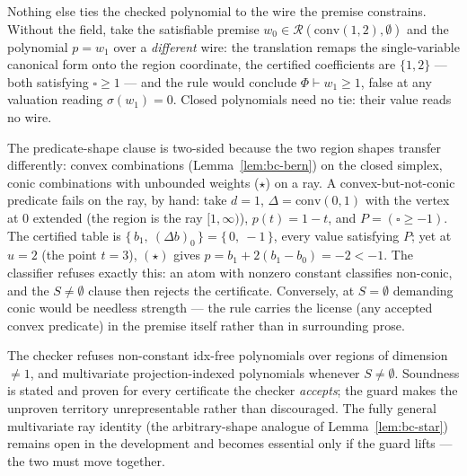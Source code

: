 \begin{bremark}
\label{rem:bc-polytie}
Nothing else ties the checked polynomial to the wire the premise
constrains. Without the field, take the satisfiable premise
$w_0 \in \mathcal{R}(\mathrm{conv}(1,2), \emptyset)$ and the polynomial
$p = w_1$ over a \emph{different} wire: the translation remaps the
single-variable canonical form onto the region coordinate, the
certified coefficients are $\{1, 2\}$ --- both satisfying
$\square \geq 1$ --- and the rule would conclude
$\Phi \vdash w_1 \geq 1$, false at any valuation reading
$\sigma(w_1) = 0$. Closed polynomials need no tie: their value reads no
wire.
\end{bremark}

\begin{bremark}
\label{rem:bc-conic-needed}
The predicate-shape clause is two-sided because the two region shapes
transfer differently: convex combinations
(Lemma~\ref{lem:bc-bern}) on the closed simplex, conic combinations
with unbounded weights ($\star$) on a ray. A convex-but-not-conic
predicate fails on the ray, by hand: take $d = 1$,
$\Delta = \mathrm{conv}(0, 1)$ with the vertex at $0$ extended (the
region is the ray $[1, \infty)$), $p(t) = 1 - t$, and
$P = (\square \geq -1)$. The certified table is
$\{\,b_1,\ (\Delta b)_0\,\} = \{\,0,\ -1\,\}$, every value satisfying
$P$; yet at $u = 2$ (the point $t = 3$), $(\star)$ gives
$p = b_1 + 2(b_1 - b_0) = -2 < -1$. The classifier refuses exactly
this: an atom with nonzero constant classifies non-conic, and the
$S \neq \emptyset$ clause then rejects the certificate. Conversely, at
$S = \emptyset$ demanding conic would be needless strength --- the rule
carries the license (any accepted convex predicate) in the premise
itself rather than in surrounding prose.
\end{bremark}

\begin{bremark}
\label{rem:bc-guard}
The checker refuses non-constant idx-free polynomials over regions of
dimension $\neq 1$, and multivariate projection-indexed polynomials
whenever $S \neq \emptyset$. Soundness is stated and proven for every
certificate the checker \emph{accepts}; the guard makes the unproven
territory unrepresentable rather than discouraged. The fully general
multivariate ray identity (the arbitrary-shape analogue of
Lemma~\ref{lem:bc-star}) remains open in the development and becomes
essential only if the guard lifts --- the two must move together.
\end{bremark}

